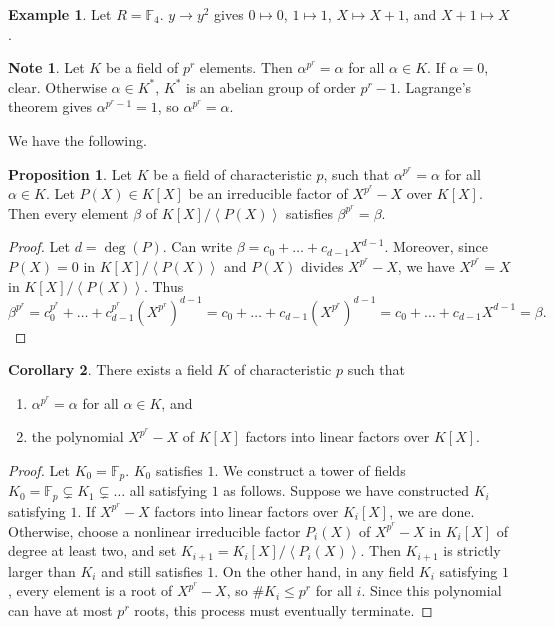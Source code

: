 \documentclass{article}
\newcommand{\F}{\mathbb{F}}
\newcommand{\rb}[1]{\left( #1 \right)}
\renewcommand{\sb}[1]{\left[ #1 \right]}
\newcommand{\ab}[1]{\left\langle #1 \right\rangle}
\theoremstyle{definition}\newtheorem{definition}{Definition}[subsection]
\theoremstyle{definition}\newtheorem{remark}[definition]{Remark}
\theoremstyle{definition}\newtheorem*{example}{Example}
\theoremstyle{definition}\newtheorem*{note}{Note}
\newtheorem{proposition}[definition]{Proposition}
\newtheorem{corollary}[definition]{Corollary}
\begin{document}
\begin{example}
Let $ R = \F_4 $. $ y \to y^2 $ gives $ 0 \mapsto 0 $, $ 1 \mapsto 1 $, $ X \mapsto X + 1 $, and $ X + 1 \mapsto X $.
\end{example}

\begin{note}
Let $ K $ be a field of $ p^r $ elements. Then $ \alpha^{p^r} = \alpha $ for all $ \alpha \in K $. If $ \alpha = 0 $, clear. Otherwise $ \alpha \in K^* $, $ K^* $ is an abelian group of order $ p^r - 1 $. Lagrange's theorem gives $ \alpha^{p^r - 1} = 1 $, so $ \alpha^{p^r} = \alpha $.
\end{note}

We have the following.

\begin{proposition}
Let $ K $ be a field of characteristic $ p $, such that $ \alpha^{p^r} = \alpha $ for all $ \alpha \in K $. Let $ P\rb{X} \in K\sb{X} $ be an irreducible factor of $ X^{p^r} - X $ over $ K\sb{X} $. Then every element $ \beta $ of $ K\sb{X} / \ab{P\rb{X}} $ satisfies $ \beta^{p^r} = \beta $.
\end{proposition}

\begin{proof}
Let $ d = \deg\rb{P} $. Can write $ \beta = c_0 + \dots + c_{d - 1}X^{d - 1} $. Moreover, since $ P\rb{X} = 0 $ in $ K\sb{X} / \ab{P\rb{X}} $ and $ P\rb{X} $ divides $ X^{p^r} - X $, we have $ X^{p^r} = X $ in $ K\sb{X} / \ab{P\rb{X}} $. Thus
$$ \beta^{p^r} = c_0^{p^r} + \dots + c_{d - 1}^{p^r}\rb{X^{p^r}}^{d - 1} = c_0 + \dots + c_{d - 1}\rb{X^{p^r}}^{d - 1} = c_0 + \dots + c_{d - 1}X^{d - 1} = \beta. $$
\end{proof}

\begin{corollary}
There exists a field $ K $ of characteristic $ p $ such that
\begin{enumerate}
\item $ \alpha^{p^r} = \alpha $ for all $ \alpha \in K $, and
\item the polynomial $ X^{p^r} - X $ of $ K\sb{X} $ factors into linear factors over $ K\sb{X} $.
\end{enumerate}
\end{corollary}

\begin{proof}
Let $ K_0 = \F_p $. $ K_0 $ satisfies $ 1 $. We construct a tower of fields $ K_0 = \F_p \subsetneq K_1 \subsetneq \dots $ all satisfying $ 1 $ as follows. Suppose we have constructed $ K_i $ satisfying $ 1 $. If $ X^{p^r} - X $ factors into linear factors over $ K_i\sb{X} $, we are done. Otherwise, choose a nonlinear irreducible factor $ P_i\rb{X} $ of $ X^{p^r} - X $ in $ K_i\sb{X} $ of degree at least two, and set $ K_{i + 1} = K_i\sb{X} / \ab{P_i\rb{X}} $. Then $ K_{i + 1} $ is strictly larger than $ K_i $ and still satisfies $ 1 $. On the other hand, in any field $ K_i $ satisfying $ 1 $, every element is a root of $ X^{p^r} - X $, so $ \#K_i \le p^r $ for all $ i $. Since this polynomial can have at most $ p^r $ roots, this process must eventually terminate.
\end{proof}
\end{document}
